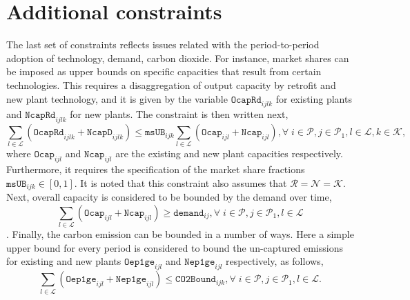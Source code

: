 \documentclass{amsart}
\begin{document}
\section{Additional constraints}
The last set of constraints reflects issues related with the period-to-period
adoption of technology, demand, carbon dioxide.  For instance, market shares can
be imposed as upper bounds on specific capacities that result from certain
technologies. This requires a disaggregation of output capacity by retrofit and
new plant technology, and it is given by the variable $\mathtt{OcapRd}_{ijlk}$
for existing plants and $\mathtt{NcapRd}_{ijlk}$ for new plants. The constraint
is then written next,
\begin{equation}
    \sum_{l\in\mathcal{L}} 
    \left(\mathtt{OcapRd}_{ijlk} + \mathtt{NcapD}_{ijlk}\right)
    \leq \mathtt{msUB}_{ijk}
    \sum_{l\in\mathcal{L}} 
    \left(\mathtt{Ocap}_{ijl} + \mathtt{Ncap}_{ijl} \right),
    \forall \; i \in \mathcal{P},j \in \mathcal{P}_1 , l \in \mathcal{L}, k \in
    \mathcal{K},
\end{equation}
%
where $\mathtt{Ocap}_{ijl}$ and $\mathtt{Ncap}_{ijl}$ are the existing and new
plant capacities respectively. Furthermore, it requires the specification of the
market share fractions $\mathtt{msUB}_{ijk}\in \left[0, 1\right]$. It is noted
that this constraint also assumes that $\mathcal{R}=\mathcal{N}=\mathcal{K}$.
Next, overall capacity is considered to be bounded by the demand over time,
\begin{equation}
    \sum_{l\in\mathcal{L}}
    \left(\mathtt{Ocap}_{ijl} + \mathtt{Ncap}_{ijl}\right) 
    \geq \mathtt{demand}_{ij},
    \forall \; i \in \mathcal{P},j \in \mathcal{P}_1 , l \in \mathcal{L}
\end{equation}.
%
Finally, the carbon emission can be bounded in a number of ways. Here a simple
upper bound for every period is considered to bound the un-captured emissions for
existing and new plants $\mathtt{Oep1ge}_{ijl}$ and $\mathtt{Nep1ge}_{ijl}$
respectively, as follows,
\begin{equation}
    \sum_{l\in\mathcal{L}} 
    \left(\mathtt{Oep1ge}_{ijl} + \mathtt{Nep1ge}_{ijl}\right) \leq 
    \mathtt{CO2Bound}_{ijk},
    \forall \; i \in \mathcal{P},j \in \mathcal{P}_1 , l \in \mathcal{L}.
\end{equation}

%
\end{document}

